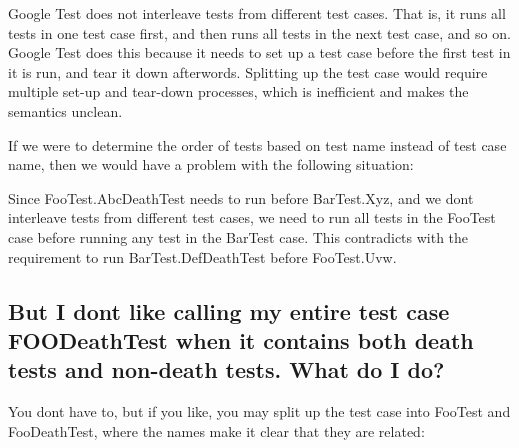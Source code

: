 Google Test does not interleave tests from different test cases. That is, it runs all tests in one test case first, and then runs all tests in the next test case, and so on. Google Test does this because it needs to set up a test case before the first test in it is run, and tear it down afterwords. Splitting up the test case would require multiple set-\/up and tear-\/down processes, which is inefficient and makes the semantics unclean.

If we were to determine the order of tests based on test name instead of test case name, then we would have a problem with the following situation\+:


\begin{DoxyCode}{0}
\DoxyCodeLine{}
\end{DoxyCode}


Since {\ttfamily Foo\+Test.\+Abc\+Death\+Test} needs to run before {\ttfamily Bar\+Test.\+Xyz}, and we don\textquotesingle{}t interleave tests from different test cases, we need to run all tests in the {\ttfamily Foo\+Test} case before running any test in the {\ttfamily Bar\+Test} case. This contradicts with the requirement to run {\ttfamily Bar\+Test.\+Def\+Death\+Test} before {\ttfamily Foo\+Test.\+Uvw}.

\subsection*{But I don\textquotesingle{}t like calling my entire test case F\+O\+O\+Death\+Test when it contains both death tests and non-\/death tests. What do I do?}

You don\textquotesingle{}t have to, but if you like, you may split up the test case into {\ttfamily Foo\+Test} and {\ttfamily Foo\+Death\+Test}, where the names make it clear that they are related\+:


\begin{DoxyCode}{0}
\DoxyCodeLine{}
\DoxyCodeLine{}
\DoxyCodeLine{}
\end{DoxyCode}


